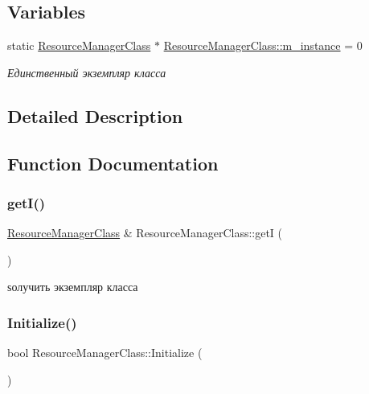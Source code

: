 \subsection*{Variables}
\begin{DoxyCompactItemize}
\item 
static \hyperlink{class_resource_manager_class}{Resource\+Manager\+Class} $\ast$ \hyperlink{group___resource_managment_ga1e74a4a5bc44d36ec144f2d623ef9ac9}{Resource\+Manager\+Class\+::m\+\_\+instance} = 0
\begin{DoxyCompactList}\small\item\em Единственный экземпляр класса \end{DoxyCompactList}\end{DoxyCompactItemize}


\subsection{Detailed Description}


\subsection{Function Documentation}
\mbox{\label{group___resource_managment_gad93d52351dac048f1cd5201e6859ff53}} 
\subsubsection{\texorpdfstring{get\+I()}{getI()}}
{\footnotesize\ttfamily \hyperlink{class_resource_manager_class}{Resource\+Manager\+Class} \& Resource\+Manager\+Class\+::getI (\begin{DoxyParamCaption}{ }\end{DoxyParamCaption})\hspace{0.3cm}{\ttfamily [static]}}



ѕолучить экземпляр класса 

\mbox{\label{group___resource_managment_ga333d99b892f59b1871f24c534760f5e8}} 
\subsubsection{\texorpdfstring{Initialize()}{Initialize()}}
{\footnotesize\ttfamily bool Resource\+Manager\+Class\+::\+Initialize (\begin{DoxyParamCaption}{ }\end{DoxyParamCaption})}



